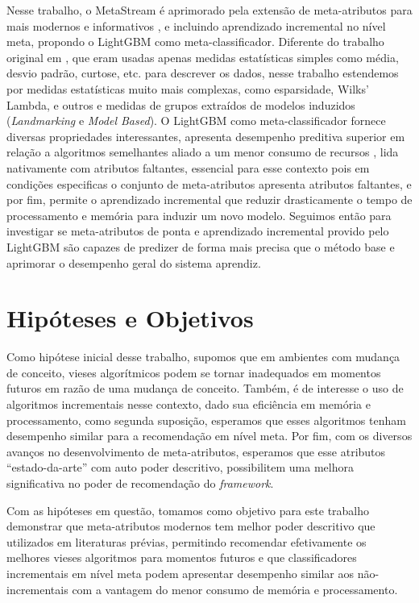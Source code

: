 Nesse trabalho, o MetaStream é aprimorado pela extensão de meta-atributos para mais modernos e informativos \cite{Rivolli2018}, e incluindo aprendizado incremental no nível meta, propondo o  LightGBM \cite{ke2017lightgbm} como meta-classificador. Diferente do trabalho original em \cite{rossi2014metastream}, que eram usadas apenas medidas estatísticas simples como média, desvio padrão, curtose, etc. para descrever os dados, nesse trabalho estendemos por medidas estatísticas muito mais complexas, como esparsidade, Wilks' Lambda, e outros e medidas de grupos extraídos de modelos induzidos (\textit{Landmarking} e \textit{Model Based}). O LightGBM como meta-classificador fornece diversas propriedades interessantes, apresenta desempenho preditiva superior em relação a algoritmos semelhantes aliado a um menor consumo de recursos \cite{lightgbmBench}, lida nativamente com atributos faltantes, essencial para esse contexto pois em condições especificas o conjunto de meta-atributos apresenta atributos faltantes, e por fim, permite o aprendizado incremental que reduzir drasticamente o tempo de processamento e memória para induzir um novo modelo. Seguimos então para investigar se meta-atributos de ponta e aprendizado incremental provido pelo LightGBM são capazes de predizer de forma mais precisa que o método base e aprimorar o desempenho geral do sistema aprendiz.


\section{Hipóteses e Objetivos}

Como hipótese inicial desse trabalho, supomos que em ambientes com mudança de conceito, vieses algorítmicos podem se tornar inadequados em momentos futuros em razão de uma mudança de conceito. Também, é de interesse o uso de algoritmos incrementais nesse contexto, dado sua eficiência em memória e processamento, como segunda suposição, esperamos que esses algoritmos tenham desempenho similar para a recomendação em nível meta. Por fim, com os diversos avanços no desenvolvimento de meta-atributos, esperamos que esse atributos ``estado-da-arte'' com auto poder descritivo, possibilitem uma melhora significativa no poder de recomendação do \textit{framework}.

Com as hipóteses em questão, tomamos como objetivo para este trabalho demonstrar que meta-atributos modernos tem melhor poder descritivo que utilizados em literaturas prévias, permitindo recomendar efetivamente os melhores vieses algoritmos para momentos futuros e que classificadores incrementais em nível meta podem apresentar desempenho similar aos não-incrementais com a vantagem do menor consumo de memória e processamento. 

